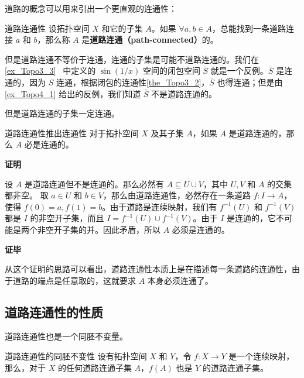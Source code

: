 道路的概念可以用来引出一个更直观的连通性：

\begin{definition}{道路连通性}\label{def_Topo4_2}
设拓扑空间 $X$ 和它的子集 $A$。如果 $\forall a, b\in A$，总能找到一条道路连接 $a$ 和 $b$，那么称 $A$ 是\textbf{道路连通（path-connected）}的。
\end{definition}

但是道路连通不等价于连通，连通的子集是可能不道路连通的。我们在\autoref{ex_Topo3_3}~ 中定义的 $\sin(1/x)$ 空间的闭包空间 $\bar{S}$ 就是一个反例。$\bar{S}$ 是连通的，因为 $S$ 连通，根据闭包的连通性\autoref{the_Topo3_2}，$\bar{S}$ 也得连通；但是由\autoref{ex_Topo4_1} 给出的反例，我们知道 $\bar{S}$ 不是道路连通的。

但是道路连通的子集一定连通。

\begin{theorem}{道路连通性推出连通性}\label{the_Topo4_1}
对于拓扑空间 $X$ 及其子集 $A$，如果 $A$ 是道路连通的，那么 $A$ 必是连通的。
\end{theorem}

\textbf{证明}

设 $A$ 是道路连通但不是连通的。那么必然有 $A\subseteq U\cup V$，其中 $U, V$ 和 $A$ 的交集都非空。
取 $a\in U$ 和 $b\in V$，那么由道路连通性，必然存在一条道路 $f:I\rightarrow A$，使得 $f(0)=a, f(1)=b$。由于道路是连续映射，我们有 $f^{-1}(U)$ 和 $f^{-1}(V)$ 都是 $I$ 的非空开子集，而且 $I=f^{-1}(U)\cup f^{-1}(V)$。由于 $I$ 是连通的，它不可能是两个非空开子集的并。因此矛盾，所以 $A$ 必须是连通的。

\textbf{证毕}

从这个证明的思路可以看出，道路连通性本质上是在描述每一条道路的连通性，由于道路的端点是任意取的，这就要求 $A$ 本身必须连通了。

\subsection{道路连通性的性质}

道路连通性也是一个同胚不变量。

\begin{theorem}{道路连通性的同胚不变性}
设有拓扑空间 $X$ 和 $Y$，令 $f:X\rightarrow Y$ 是一个连续映射，那么，对于 $X$ 的任何道路连通子集 $A$，$f(A)$ 也是 $Y$ 的道路连通子集。
\end{theorem}
